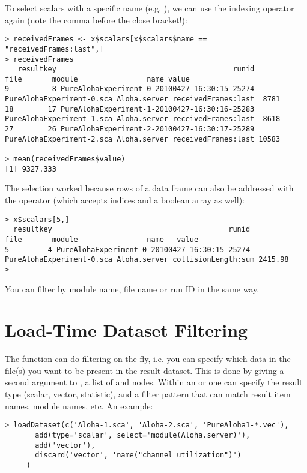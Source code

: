 To select scalars with a specific name (e.g. ), we can use the
indexing operator again (note the comma before the close bracket!):

\begin{verbatim}
> receivedFrames <- x$scalars[x$scalars$name == "receivedFrames:last",]
> receivedFrames
   resultkey                                         runid                      file       module                name value
9          8 PureAlohaExperiment-0-20100427-16:30:15-25274 PureAlohaExperiment-0.sca Aloha.server receivedFrames:last  8781
18        17 PureAlohaExperiment-1-20100427-16:30:16-25283 PureAlohaExperiment-1.sca Aloha.server receivedFrames:last  8618
27        26 PureAlohaExperiment-2-20100427-16:30:17-25289 PureAlohaExperiment-2.sca Aloha.server receivedFrames:last 10583

> mean(receivedFrames$value)
[1] 9327.333
\end{verbatim}

The selection worked because rows of a data frame can also be addressed with the
\ttt{[]} operator (which accepts indices and a boolean array as well):

\begin{verbatim}
> x$scalars[5,]
  resultkey                                         runid                      file       module                name   value
5         4 PureAlohaExperiment-0-20100427-16:30:15-25274 PureAlohaExperiment-0.sca Aloha.server collisionLength:sum 2415.98
> \end{verbatim}

You can filter by module name, file name or run ID in the same way.


\section{Load-Time Dataset Filtering}

The  function can do filtering on the fly, i.e. you can specify 
which data in the file(s) you want to be present in the result dataset. This is done
by giving a second argument to , a list of  and 
nodes. Within an  or  one can specify the result type (scalar, vector, 
statistic), and a filter pattern that can match result item names, module names, etc.
An example:

\begin{verbatim}
> loadDataset(c('Aloha-1.sca', 'Aloha-2.sca', 'PureAloha1-*.vec'),
       add(type='scalar', select='module(Aloha.server)'),
       add('vector'),
       discard('vector', 'name("channel utilization")')
     )
\end{verbatim}


